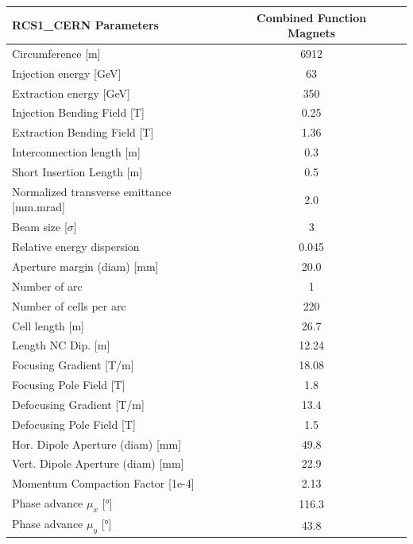 \begin{tabular}{lcc}
\toprule
RCS1_CERN Parameters & Combined Function Magnets \\
\midrule
Circumference [m] & 6912 \\
Injection energy [GeV] & 63 \\
Extraction energy [GeV] & 350 \\
Injection Bending Field [T] & 0.25 \\
Extraction Bending Field [T] & 1.36 \\
Interconnection length [m] & 0.3 \\
Short Insertion Length  [m] & 0.5 \\
Normalized transverse emittance [mm.mrad] & 2.0 \\
Beam size [$\sigma$] & 3 \\
Relative energy dispersion & 0.045 \\
Aperture margin (diam) [mm] & 20.0 \\
Number of arc & 1 \\
Number of cells per arc & 220 \\
Cell length [m] & 26.7 \\
Length NC Dip. [m] & 12.24 \\
Focusing Gradient [T/m] & 18.08 \\
Focusing Pole Field [T] & 1.8 \\
Defocusing Gradient [T/m] & 13.4 \\
Defocusing Pole Field [T] & 1.5 \\
Hor. Dipole Aperture (diam) [mm] & 49.8 \\
Vert. Dipole Aperture (diam) [mm] & 22.9 \\
Momentum Compaction Factor [1e-4] & 2.13 \\
Phase advance $\mu_x$ [°] & 116.3 \\
Phase advance $\mu_y$ [°] & 43.8 \\
\bottomrule
\end{tabular}
